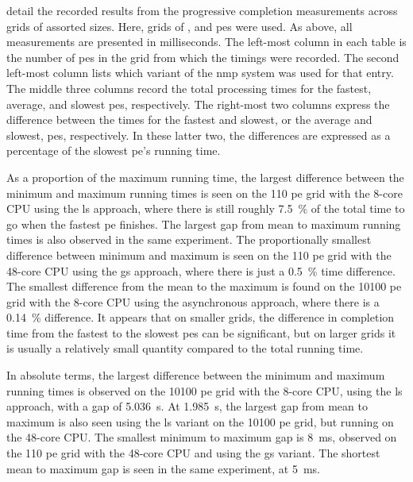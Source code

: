  detail the recorded results from the progressive completion measurements across grids of assorted sizes.  Here, grids of ,  and  \glspl{pe} were used.  As above, all measurements are presented in milliseconds.  The left-most column in each table is the number of \glspl{pe} in the grid from which the timings were recorded.  The second left-most column lists which variant of the \gls{nmp} system was used for that entry.  The middle three columns record the total processing times for the fastest, average, and slowest \glspl{pe}, respectively.  The right-most two columns express the difference between the times for the fastest and slowest, or the average and slowest, \glspl{pe}, respectively.  In these latter two, the differences are expressed as a percentage of the slowest \gls{pe}'s running time.

As a proportion of the maximum running time, the largest difference between the minimum and maximum running times is seen on the \num{110} \gls{pe} grid with the 8-core CPU using the \gls{ls} approach, where there is still roughly \qty{7.5}{\percent} of the total time to go when the fastest \gls{pe} finishes.  The largest gap from mean to maximum running times is also observed in the same experiment.  The proportionally smallest difference between minimum and maximum is seen on the \num{110} \gls{pe} grid with the 48-core CPU using the \gls{gs} approach, where there is just a \qty{0.5}{\percent} time difference.  The smallest difference from the mean to the maximum is found on the \num{10 100} \gls{pe} grid with the 8-core CPU using the asynchronous approach, where there is a \qty{0.14}{\percent} difference.  It appears that on smaller grids, the difference in completion time from the fastest to the slowest \glspl{pe} can be significant, but on larger grids it is usually a relatively small quantity compared to the total running time.

In absolute terms, the largest difference between the minimum and maximum running times is observed on the \num{10 100} \gls{pe} grid with the 8-core CPU, using the \gls{ls} approach, with a gap of \qty{5.036}{\second}.  At \qty{1.985}{\second}, the largest gap from mean to maximum is also seen using the \gls{ls} variant on the \num{10 100} \gls{pe} grid, but running on the 48-core CPU.  The smallest minimum to maximum gap is \qty{8}{\milli\second}, observed on the \num{110} \gls{pe} grid with the 48-core CPU and using the \gls{gs} variant.  The shortest mean to maximum gap is seen in the same experiment, at \qty{5}{\milli\second}.


